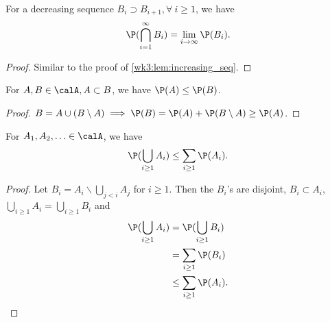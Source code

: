 \documentclass[../aipt.tex]{subfiles}
\begin{document}
\begin{Corollary}\label{wk3:cor:dec_seq}
For a decreasing sequence $B_i \supset B_{i+1}, \forall\ i\geq1$, we have
\begin{align*}
\P(\bigcap\limits_{i=1}^{\infty} B_i) = \lim_{i \to \infty} \P(B_i).
\end{align*}
\end{Corollary}
%
\begin{proof}
Similar to the proof of \cref{wk3:lem:increasing_seq}.
\end{proof}

\begin{Lemma}
For $A, B \in \calA, A \subset B$, we have $\P(A) \leq \P(B)$.
\end{Lemma}
\begin{proof}
$B = A \cup (B \setminus A) \implies \P(B) = \P(A) + \P(B \setminus A) \geq \P(A)$.
\end{proof}

\begin{Lemma}\label{wk3:lem:union_bound}
For $A_1, A_2, \ldots \in \calA$, we have 
\begin{align*}
\P(\bigcup_{i\geq1} A_i) \leq \sum_{i\geq1} \P(A_i).
\end{align*}
\end{Lemma}
\begin{proof}
Let $B_i = A_i \backslash \bigcup_{j<i} A_j$ for $i\geq 1$. Then the $B_i$'s are disjoint, $B_i \subset A_i$, $\bigcup_{i\geq1} A_i =  \bigcup_{i\geq1} B_i$ and
\begin{align*}
\P(\bigcup_{i\geq1} A_i) 
&= \P(\bigcup_{i\geq1} B_i)\\ 
&= \sum_{i\geq1} \P(B_i)\\
&\leq \sum_{i\geq1} \P(A_i).
\end{align*}
\end{proof}
\end{document}
